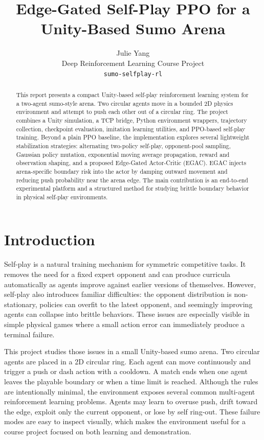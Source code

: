 \documentclass{article}
\title{Edge-Gated Self-Play PPO for a Unity-Based Sumo Arena}
\author{%
  Julie Yang\\
  Deep Reinforcement Learning Course Project\\
  \texttt{sumo-selfplay-rl}\\
}
\begin{document}
\maketitle

\begin{abstract}
This report presents a compact Unity-based self-play reinforcement learning system for a two-agent sumo-style arena. Two circular agents move in a bounded 2D physics environment and attempt to push each other out of a circular ring. The project combines a Unity simulation, a TCP bridge, Python environment wrappers, trajectory collection, checkpoint evaluation, imitation learning utilities, and PPO-based self-play training. Beyond a plain PPO baseline, the implementation explores several lightweight stabilization strategies: alternating two-policy self-play, opponent-pool sampling, Gaussian policy mutation, exponential moving average propagation, reward and observation shaping, and a proposed Edge-Gated Actor-Critic (EGAC). EGAC injects arena-specific boundary risk into the actor by damping outward movement and reducing push probability near the arena edge. The main contribution is an end-to-end experimental platform and a structured method for studying brittle boundary behavior in physical self-play environments.
\end{abstract}

\section{Introduction}

Self-play is a natural training mechanism for symmetric competitive tasks. It removes the need for a fixed expert opponent and can produce curricula automatically as agents improve against earlier versions of themselves. However, self-play also introduces familiar difficulties: the opponent distribution is non-stationary, policies can overfit to the latest opponent, and seemingly improving agents can collapse into brittle behaviors. These issues are especially visible in simple physical games where a small action error can immediately produce a terminal failure.

This project studies those issues in a small Unity-based sumo arena. Two circular agents are placed in a 2D circular ring. Each agent can move continuously and trigger a push or dash action with a cooldown. A match ends when one agent leaves the playable boundary or when a time limit is reached. Although the rules are intentionally minimal, the environment exposes several common multi-agent reinforcement learning problems. Agents may learn to overuse push, drift toward the edge, exploit only the current opponent, or lose by self ring-out. These failure modes are easy to inspect visually, which makes the environment useful for a course project focused on both learning and demonstration.
\end{document}
